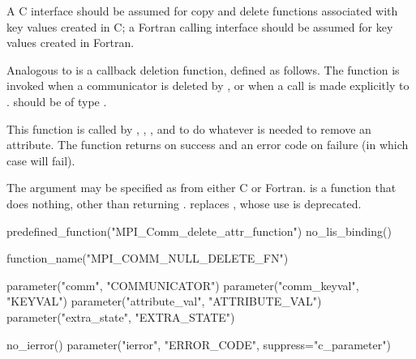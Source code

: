 \begin{implementors}
A C interface should be assumed for copy and delete functions
associated with key values created in C; a Fortran calling interface
should be assumed for key values created in Fortran.
\end{implementors}

Analogous to  is a callback deletion function, defined
as follows. The  function is invoked when a communicator is
deleted by ,  or when a call is made explicitly to
.
 should be
of type .

This function is called by ,
,
,
and 
to do whatever is needed to remove an attribute.
The function returns  on
success and an error code on failure (in which case
 will fail).

The argument  may be specified as\flushline %
from either C or Fortran.\flushline %
 is a function that does nothing, other
than returning . 
replaces , whose use is deprecated.

\begin{mpi-binding}
    predefined_function("MPI_Comm_delete_attr_function")
    no_lis_binding()
    
    function_name("MPI_COMM_NULL_DELETE_FN")
    
    parameter("comm", "COMMUNICATOR")
    parameter("comm_keyval", "KEYVAL")
    parameter("attribute_val", "ATTRIBUTE_VAL")
    parameter("extra_state", "EXTRA_STATE")
    
    no_ierror()
    parameter("ierror", "ERROR_CODE", suppress="c_parameter")
\end{mpi-binding}

